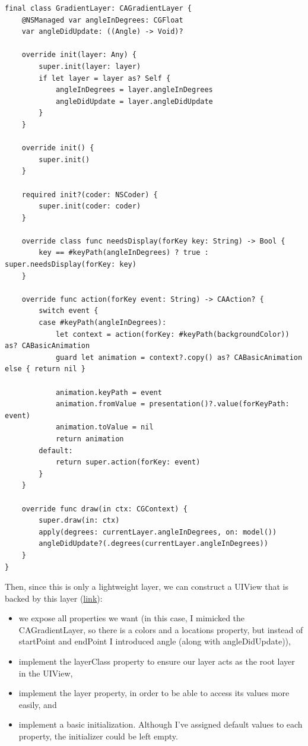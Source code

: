 \documentclass{article}
\begin{document}
\begin{lstlisting}
final class GradientLayer: CAGradientLayer {
    @NSManaged var angleInDegrees: CGFloat
    var angleDidUpdate: ((Angle) -> Void)?

    override init(layer: Any) {
        super.init(layer: layer)
        if let layer = layer as? Self {
            angleInDegrees = layer.angleInDegrees
            angleDidUpdate = layer.angleDidUpdate
        }
    }

    override init() {
        super.init()
    }

    required init?(coder: NSCoder) {
        super.init(coder: coder)
    }

    override class func needsDisplay(forKey key: String) -> Bool {
        key == #keyPath(angleInDegrees) ? true : super.needsDisplay(forKey: key)
    }

    override func action(forKey event: String) -> CAAction? {
        switch event {
        case #keyPath(angleInDegrees):
            let context = action(forKey: #keyPath(backgroundColor)) as? CABasicAnimation
            guard let animation = context?.copy() as? CABasicAnimation else { return nil }

            animation.keyPath = event
            animation.fromValue = presentation()?.value(forKeyPath: event)
            animation.toValue = nil
            return animation
        default:
            return super.action(forKey: event)
        }
    }

    override func draw(in ctx: CGContext) {
        super.draw(in: ctx)
        apply(degrees: currentLayer.angleInDegrees, on: model())
        angleDidUpdate?(.degrees(currentLayer.angleInDegrees))
    }
}
\end{lstlisting}

Then, since this is only a lightweight layer, we can construct a UIView that is backed by this layer (\href{https://github.com/stateman92/Medium-AnimatableProperties/commit/a8b03b891f1e722273aaaf508cd089a1e4c06186}{link}):

\begin{itemize}
  \item we expose all properties we want (in this case, I mimicked the CAGradientLayer, so there is a colors and a locations property, but instead of startPoint and endPoint I introduced angle (along with angleDidUpdate)),
  \item implement the layerClass property to ensure our layer acts as the root layer in the UIView,
  \item implement the layer property, in order to be able to access its values more easily, and
  \item implement a basic initialization. Although I've assigned default values to each property, the initializer could be left empty.
\end{itemize}
\end{document}
